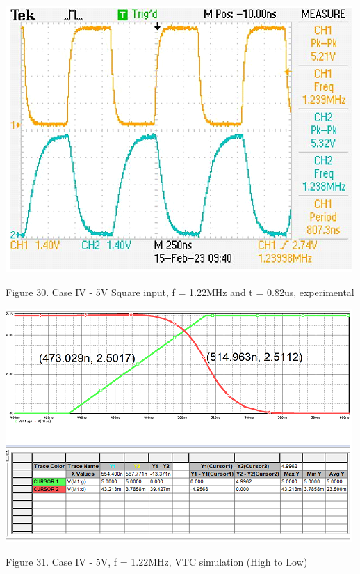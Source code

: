 \documentclass[conference]{IEEEtran}
\begin{document}
\begin{center}
    \centerline{\includegraphics[scale = 0.6]{figures/case4_lab_results.png}}
    Figure 30. Case IV - 5V Square input, f = 1.22MHz and t = 0.82us, experimental
\end{center}

\begin{center}
    \centerline{\includegraphics[scale = 0.6]{figures/case4_results_HL.png}}
    Figure 31. Case IV - 5V, f = 1.22MHz, VTC simulation (High to Low)
\end{center}
\end{document}

